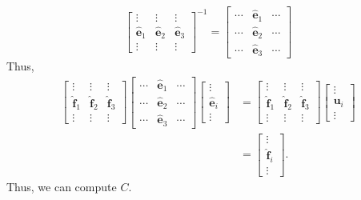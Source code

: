 \documentclass[12 pt, letterpaper]{hmcpset}
\begin{document}
\begin{solution}
	\[
		\begin{bmatrix}
			\vdots & \vdots & \vdots \\
			\hat{\mathbf{e}}_{1} & \hat{\mathbf{e}}_{2} & \hat{\mathbf{e}}_{3} \\
			\vdots & \vdots & \vdots
		\end{bmatrix}^{-1} = 
		\begin{bmatrix}
			\cdots & \hat{\mathbf{e}}_{1} & \cdots \\
			\cdots & \hat{\mathbf{e}}_{2} & \cdots \\
			\cdots & \hat{\mathbf{e}}_{3} & \cdots
		\end{bmatrix}
	\]
	Thus,
	\[
		\begin{split}
			\begin{bmatrix}
				\vdots & \vdots & \vdots \\
				\hat{\mathbf{f}}_{1} & \hat{\mathbf{f}}_{2} & \hat{\mathbf{f}}_{3} \\
					\vdots & \vdots & \vdots
			\end{bmatrix}
			\begin{bmatrix}
				\cdots & \hat{\mathbf{e}}_{1} & \cdots \\
				\cdots & \hat{\mathbf{e}}_{2} & \cdots \\
				\cdots & \hat{\mathbf{e}}_{3} & \cdots
			\end{bmatrix}
			\begin{bmatrix}
				\vdots \\
				\hat{\mathbf{e}}_{i} \\
				\vdots
			\end{bmatrix} & = 
			\begin{bmatrix}
				\vdots & \vdots & \vdots \\
				\hat{\mathbf{f}}_{1} & \hat{\mathbf{f}}_{2} & \hat{\mathbf{f}}_{3} \\
					\vdots & \vdots & \vdots
			\end{bmatrix}
			\begin{bmatrix}
				\vdots \\
				\mathbf{u}_{i} \\
				\vdots
			\end{bmatrix} \\ 
			& = 
			\begin{bmatrix}
				\vdots \\
				\hat{\mathbf{f}}_{i} \\
				\vdots
			\end{bmatrix}.
		\end{split}
	\]
	Thus, we can compute $C$.

\end{solution}
\end{document}
